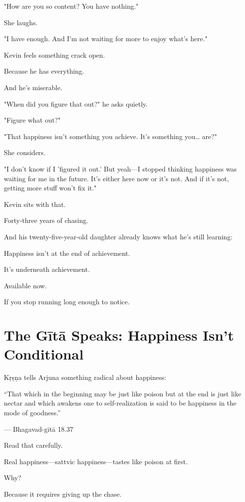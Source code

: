 \documentclass[11pt,twoside]{book}
\begin{document}
"How are you so content? You have nothing."

She laughs.

"I have enough. And I'm not waiting for more to enjoy what's here."

Kevin feels something crack open.

Because he has everything.

And he's miserable.

"When did you figure that out?" he asks quietly.

"Figure what out?"

"That happiness isn't something you achieve. It's something you\ldots{} are?"

She considers.

"I don't know if I 'figured it out.' But yeah—I stopped thinking happiness was waiting for me in the future. It's either here now or it's not. And if it's not, getting more stuff won't fix it."

Kevin sits with that.

Forty-three years of chasing.

And his twenty-five-year-old daughter already knows what he's still learning:

Happiness isn't at the end of achievement.

It's underneath achievement.

Available now.

If you stop running long enough to notice.

\section*{The Gītā Speaks: Happiness Isn't Conditional}

Kṛṣṇa tells Arjuna something radical about happiness:

\begin{pullquote}
``That which in the beginning may be just like poison but at the end is just like nectar and which awakens one to self-realization is said to be happiness in the mode of goodness.''

--- Bhagavad-gītā 18.37
\end{pullquote}

Read that carefully.

Real happiness—sattvic happiness—tastes like poison at first.

Why?

Because it requires giving up the chase.
\end{document}
